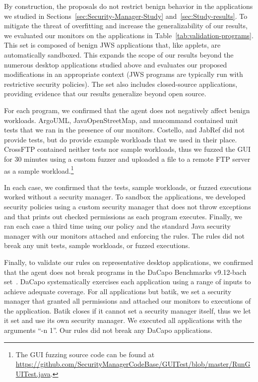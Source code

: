 \documentclass{sig-alternate}
\begin{document}
By construction, the proposals do not restrict
benign behavior in the applications we studied in
Sections~\ref{sec:Security-Manager-Study} and~\ref{sec:Study-results}.
To mitigate the threat of overfitting and increase the generalizability of our results, we 
evaluated our monitors on the applications
in Table~\ref{tab:validation-programs}. This set is composed of benign JWS
applications that, like applets, are automatically sandboxed.  This
expands the scope of our results beyond the numerous desktop applications
studied above and evaluates our proposed modifications in an
appropriate context (JWS programs are typically run with restrictive
security policies).  The set also includes closed-source applications,
providing evidence that our results generalize beyond open
source.

For each program, we confirmed that the agent does not negatively affect benign workloads. ArgoUML, JavaOpenStreetMap, and mucommand 
contained unit tests that we ran in the presence of our monitors. Costello, and
JabRef did not provide tests, but do provide example workloads that we used
in their place. CrossFTP contained neither tests nor sample workloads, thus
we fuzzed the GUI for 30 minutes using a custom fuzzer and uploaded a file to a
remote FTP server as a sample workload.\footnote{The GUI fuzzing source code can
  be found at
  \url{https://github.com/SecurityManagerCodeBase/GUITest/blob/master/RunGUITest.java}.} 

In each case, we confirmed that the tests, sample workloads, or fuzzed executions
worked without a security manager. To sandbox the applications,
we developed security policies using a custom security manager that does not throw exceptions 
and that prints out checked permissions as each program executes. Finally, we
ran each case a third time 
using our policy and the standard Java security manager with our monitors
attached and enforcing the rules. The rules did not break any unit tests, sample
workloads, or fuzzed executions.

Finally, to validate our rules on representative desktop applications, we confirmed that the
agent does not break programs in the DaCapo Benchmarks v9.12-bach set~\cite{dacapo}. 
DaCapo systematically exercises each application using a range of inputs to achieve
adequate coverage. For all
applications but batik, we set a security manager that granted all
permissions and attached our monitors to executions of the application. Batik closes if it cannot set a security manager itself, thus we let it set and use its
own security manager.
 We executed all applications with the arguments ``-n 1''. 
Our rules did not break any DaCapo applications.
\end{document}
